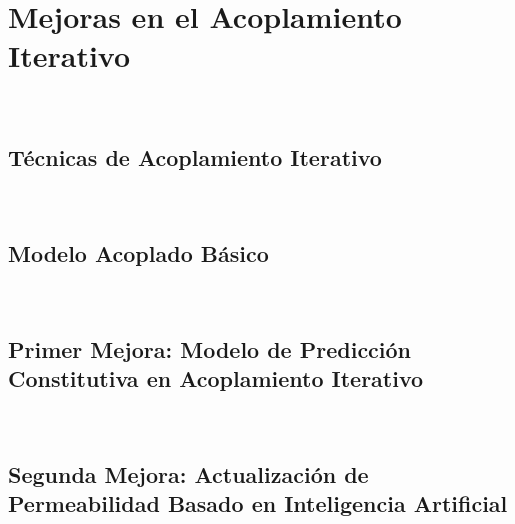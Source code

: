 %





\chapter{Mejoras en el Acoplamiento Iterativo}~\hypertarget{ch:chapter_07}{}
\label{ch:chapter_07}

\lipsum[1-2]

\section{Técnicas de Acoplamiento Iterativo}~\hypertarget{sec:sec710}{}
\label{sec:sec710}



\section{Modelo Acoplado Básico}~\hypertarget{sec:sec720}{}
\label{sec:sec720}


\section{Primer Mejora: Modelo de Predicción Constitutiva en Acoplamiento Iterativo}~\hypertarget{sec:sec730}{}
\label{sec:sec730}


\section{Segunda Mejora: Actualización de Permeabilidad Basado en Inteligencia Artificial}~\hypertarget{sec:sec740}{}
\label{sec:sec740}


